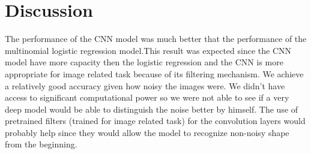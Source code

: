 \documentclass[12pt,english]{article}
\begin{document}
\section{Discussion}
The performance of the CNN model was much better that the performance of the multinomial logistic regression model.This result was expected since the CNN model have more capacity then the logistic regression and the CNN is more appropriate for image related task because of its filtering mechanism. We achieve a relatively good accuracy given how noisy the images were.  We didn't have access to significant computational power so we were not able to see if a very deep model would be able to distinguish the noise better by himself. The use of pretrained filters (trained for image related task) for the convolution layers would probably help since they would allow the model to recognize non-noisy shape from the beginning.
\end{document}
